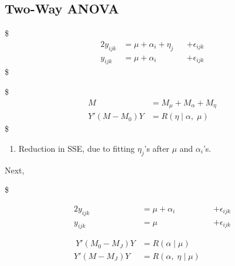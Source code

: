 \documentclass[
]{book}
\providecommand{\tightlist}{%
  \setlength{\itemsep}{0pt}\setlength{\parskip}{0pt}}
\begin{document}
{{{\hypertarget{two-way-anova}{%
\subsection{Two-Way ANOVA}\label{two-way-anova}}

\$
\begin{alignat}{2}
y_{ijk} &= \mu + \alpha_i + \eta_j &&+ \epsilon_{ijk} \tag{FM}

\\





y_{ijk} &= \mu + \alpha_i  &&+ \epsilon_{ijk} \tag{RM}


\end{alignat}
\$

\$
\begin{align}
M &= M_\mu + M_\alpha + M_\eta

\\

Y'(M-M_0)Y &= R(\eta \; \Big \vert \; \alpha, \; \mu) \tag{1}


\end{align}
\$

\begin{enumerate}
\def\labelenumi{\arabic{enumi}.}
\tightlist
\item
  Reduction in SSE, due to fitting \(\eta_j\)'s after \(\mu\) and \(\alpha_i\)'s.
\end{enumerate}

Next,

\$

\begin{alignat}{2}
y_{ijk} &= \mu + \alpha_i &&+ \epsilon_{ijk} \tag{FM}

\\





y_{ijk} &= \mu &&+ \epsilon_{ijk} \tag{RM}


\\

\\\

\\\


Y'(M_0-M_J)Y &= R(\alpha \; \Big \vert \; \mu) 

\\

Y'(M-M_J)Y &= R(\alpha, \; \eta \; \Big \vert \; \mu)

\\


\end{alignat}}}}
\end{document}
